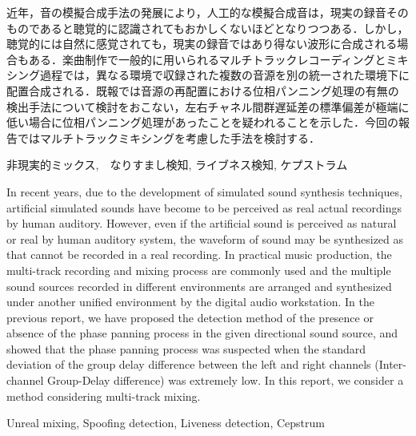 \documentclass[technicalreport]{ieicej}
\begin{document}
\begin{jabstract}
近年，音の模擬合成手法の発展により，人工的な模擬合成音は，現実の録音そのものであると聴覚的に認識されてもおかしくないほどとなりつつある．しかし，聴覚的には自然に感覚されても，現実の録音ではあり得ない波形に合成される場合もある．楽曲制作で一般的に用いられるマルチトラックレコーディングとミキシング過程では，異なる環境で収録された複数の音源を別の統一された環境下に配置合成される．既報では音源の再配置における位相パンニング処理の有無の検出手法について検討をおこない，左右チャネル間群遅延差の標準偏差が極端に低い場合に位相パンニング処理があったことを疑われることを示した．今回の報告ではマルチトラックミキシングを考慮した手法を検討する．
\end{jabstract}
\begin{jkeyword}
非現実的ミックス,　なりすまし検知, ライブネス検知, ケプストラム
\end{jkeyword}
\begin{eabstract}
In recent years, due to the development of simulated sound synthesis techniques, artificial simulated sounds have become to be perceived as real actual recordings by human auditory. However, even if the artificial sound is perceived as natural or real by human auditory system, the waveform of sound may be synthesized as that cannot be recorded in a real recording. In practical music production, the multi-track recording and mixing process are commonly used and the multiple sound sources recorded in different environments are arranged and synthesized under another unified environment by the digital audio workstation. In the previous report, we have proposed the detection method of the presence or absence of the phase panning process in the given directional sound source, and showed that the phase panning process was suspected when the standard deviation of the group delay difference between the left and right channels (Inter-channel Group-Delay difference) was extremely low. In this report, we consider a method considering multi-track mixing.
\end{eabstract}
\begin{ekeyword}
Unreal mixing, Spoofing detection, Liveness detection, Cepstrum
\end{ekeyword}
\maketitle
\end{document}
